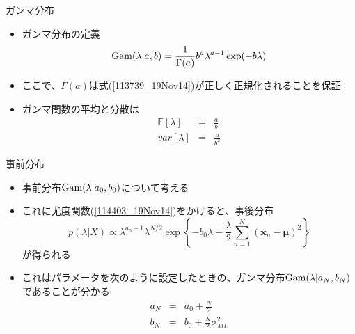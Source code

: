 \begin{frame}{ガンマ分布}
 \begin{itemize}
  \item ガンマ分布の定義
        \begin{equation}
         {\rm Gam}(\lambda|a,b) = \frac{1}{\Gamma(a)}b^a\lambda^{a-1}\exp(-b\lambda)\label{113739_19Nov14}
        \end{equation}
  \item ここで、$\Gamma(a)$は式(\ref{113739_19Nov14})が正しく正規化されることを保証
  \item ガンマ関数の平均と分散は
        \begin{eqnarray}
         \mathbb{E}[\lambda] &=& \frac{a}{b}\\
         var[\lambda]& =& \frac{a}{b^2}
        \end{eqnarray}
 \end{itemize}
\end{frame}

\begin{frame}{事前分布}
 \begin{itemize}
  \item 事前分布${\rm Gam}(\lambda|a_0,b_0)$について考える
  \item これに尤度関数(\ref{114403_19Nov14})をかけると、事後分布
        \begin{equation}
         p(\lambda|X) \propto \lambda^{a_0-1}\lambda^{N/2}\exp\left\{-b_0\lambda-\frac{\lambda}{2}\sum_{n=1}^{N}(\bm{x}_n-\bm{\mu})^2\right\}\label{114734_19Nov14}
        \end{equation}
        が得られる
  \item これはパラメータを次のように設定したときの、ガンマ分布${\rm Gam}(\lambda|a_N,b_N)$であることが分かる
        \begin{eqnarray}
         a_N&=& a_0 + \frac{N}{2}\label{115004_19Nov14}\\
         b_N%
         &= & b_0+\frac{N}{2}\sigma^2_{ML}\label{115046_19Nov14}
        \end{eqnarray}
 \end{itemize}
\end{frame}

